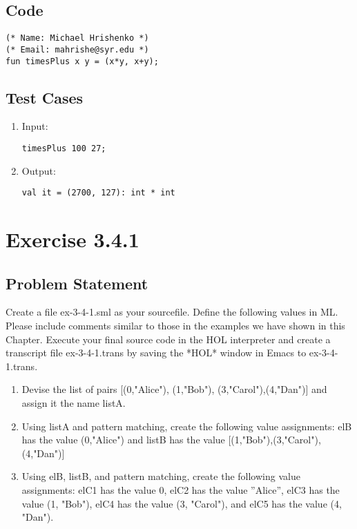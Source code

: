 \documentclass[oneside]{book}
\begin{document}
\section{Code}
    \begin{lstlisting}
(* Name: Michael Hrishenko *)
(* Email: mahrishe@syr.edu *)
fun timesPlus x y = (x*y, x+y);
    \end{lstlisting}
\section{Test Cases}
\begin{enumerate}
    \item Input:
        \begin{lstlisting}
timesPlus 100 27;
        \end{lstlisting}
    \item Output:
        \begin{lstlisting}
val it = (2700, 127): int * int
        \end{lstlisting}
\end{enumerate}

\chapter{Exercise 3.4.1}
\section{Problem Statement}
Create a file ex-3-4-1.sml as your sourcefile. Define the following values in ML. Please include comments similar to those in the examples we have shown in this Chapter. Execute your final source code in the HOL interpreter and create a transcript file ex-3-4-1.trans by saving the *HOL* window in Emacs to ex-3-4-1.trans. 
\begin{enumerate}
    \item Devise the list of pairs [(0,"Alice"), (1,"Bob"), (3,"Carol"),(4,"Dan")] and assign it the name listA.
    \item Using listA and pattern matching, create the following value assignments: elB has the value (0,"Alice") and listB has the value [(1,"Bob"),(3,"Carol"),(4,"Dan")]
    \item Using elB, listB, and pattern matching, create the following value assignments: elC1 has the value 0, elC2 has the value ”Alice”, elC3 has the value (1, "Bob"), elC4 has the value (3, "Carol"), and elC5 has the value (4, "Dan").
\end{enumerate}
\end{document}
